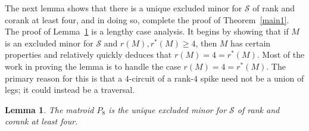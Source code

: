 \documentclass[11pt]{amsart}
\newtheorem{lemma}[theorem]{Lemma}
\numberwithin{equation}{section} %
\newcommand{\cS}{\mathcal{S}}
\begin{document}
The next lemma shows that there is a unique excluded minor for $\mathcal{S}$ of rank and corank at least four, and in doing so, complete the proof of Theorem~\ref{main1}. The proof of Lemma~\ref{rank4} is a lengthy case analysis. It begins by showing that if $M$ is an excluded minor for $\mathcal S$ and $r(M), r^*(M)\ge 4$, then $M$ has certain properties and relatively quickly deduces that $r(M)=4=r^*(M)$. Most of the work in proving the lemma is to handle the case $r(M)=4=r^*(M)$. The primary reason for this is that a $4$-circuit of a rank-$4$ spike need not be a union of legs; it could instead be a traversal.  

\begin{lemma}
The matroid $P_8$ is the unique excluded minor for $\cS$ of rank and corank at least four.
\label{rank4}
\end{lemma}
\end{document}
